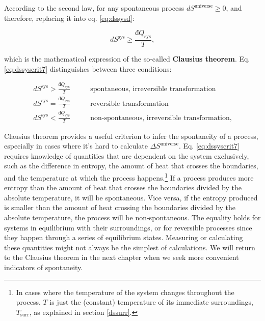 \documentclass[
  9pt,
]{extbook}
\theoremstyle{definition}
\theoremstyle{definition}
\theoremstyle{definition}
\theoremstyle{definition}
\theoremstyle{remark}
\begin{document}
According to the second law, for any spontaneous process \(d S^{\mathrm{universe}}\geq0\), and therefore, replacing it into eq. \eqref{eq:dssysd}:

\begin{equation}
d S^{\mathrm{sys}} \geq \frac{đQ_{\text{sys}}}{T},
\label{eq:dssyscrit7}
\end{equation}

which is the mathematical expression of the so-called \textbf{Clausius theorem}. Eq. \eqref{eq:dssyscrit7} distinguishes between three conditions:

\begin{equation}
\begin{aligned}
d S^{\mathrm{sys}} > \frac{đQ_{\text{sys}}}{T} \qquad &\text{spontaneous, irreversible transformation} \\
d S^{\mathrm{sys}} = \frac{đQ_{\text{sys}}}{T} \qquad &\text{reversible transformation} \\
d S^{\mathrm{sys}} < \frac{đQ_{\text{sys}}}{T} \qquad &\text{non-spontaneous, irreversible transformation}, 
\end{aligned}
\label{eq:dssyscond}
\end{equation}

Clausius theorem provides a useful criterion to infer the spontaneity of a process, especially in cases where it's hard to calculate \(\Delta S^{\mathrm{universe}}\). Eq. \eqref{eq:dssyscrit7} requires knowledge of quantities that are dependent on the system exclusively, such as the difference in entropy, the amount of heat that crosses the boundaries, and the temperature at which the process happens.\footnote{In cases where the temperature of the system changes throughout the process, \(T\) is just the (constant) temperature of its immediate surroundings, \(T_{\text{surr}}\), as explained in section \ref{dssurr}.} If a process produces more entropy than the amount of heat that crosses the boundaries divided by the absolute temperature, it will be spontaneous. Vice versa, if the entropy produced is smaller than the amount of heat crossing the boundaries divided by the absolute temperature, the process will be non-spontaneous. The equality holds for systems in equilibrium with their surroundings, or for reversible processes since they happen through a series of equilibrium states. Measuring or calculating these quantities might not always be the simplest of calculations. We will return to the Clausius theorem in the next chapter when we seek more convenient indicators of spontaneity.
\end{document}
